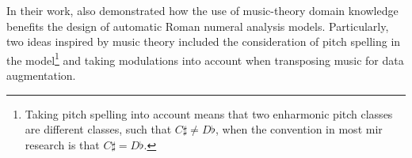 

In their work, \textcite{micchi2020not} also demonstrated
how the use of music-theory domain knowledge benefits the
design of automatic Roman numeral analysis models.
Particularly, two ideas inspired by music theory included
the consideration of pitch spelling in the
model\footnote{Taking pitch spelling into account means that
two enharmonic pitch classes are different classes, such
that $C\sharp \neq D\flat$, when the convention in most \gls{mir}
research is that $C\sharp = D\flat$.} and taking modulations
into account when transposing music for data augmentation.

